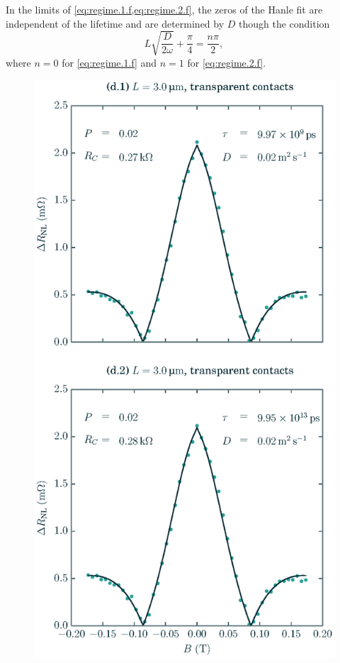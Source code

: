 In the limits of \cref{eq:regime.1.f,eq:regime.2.f},
the zeros of the Hanle fit are independent of the lifetime
and are determined by $D$ though the condition
\begin{equation}
  L \sqrt{\frac{D}{2 ω}} + \frac{π}{4} = \frac{n π}{2},
\end{equation}
where $n = 0$ for \cref{eq:regime.1.f} and $n = 1$ for \cref{eq:regime.2.f}.

\begin{figure}
  \centering
  \includegraphics[height=0.8\textheight]{figures/plot_fits_large_lifetime}

\end{figure}
